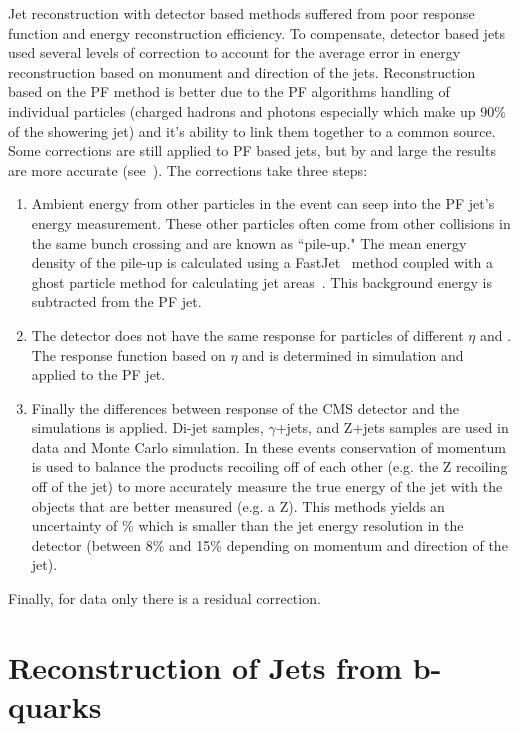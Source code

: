 	Jet reconstruction with detector based methods suffered from poor response function and energy reconstruction efficiency. To compensate, detector based jets used several levels of correction to account for the average error in energy reconstruction based on monument and direction of the jets. Reconstruction based on the PF method is better due to the PF algorithms handling of individual particles (charged hadrons and photons especially which make up 90\% of the showering jet) and it's ability to link them together to a common source. Some corrections are still applied to PF based jets, but by and large the results are more accurate (see~\cite{cmsjetcal}). The corrections take three steps:
	\begin{enumerate}
	\item Ambient energy from other particles in the event can seep into the PF jet's energy measurement. These other particles often come from other collisions in the same bunch crossing and are known as ``pile-up." The mean energy density of the pile-up is calculated using a FastJet~\cite{fastjet} method coupled with a ghost particle method for calculating jet areas~\cite{jetarea}. This background energy is subtracted from the PF jet.
	\item The detector does not have the same response for particles of different $\eta$ and \pt. The response function based on $\eta$ and \pt is determined in simulation and applied to the PF jet.
	\item Finally the differences between response of the CMS detector and the simulations is applied. Di-jet samples, $\gamma$+jets, and Z+jets samples are used in data and Monte Carlo simulation. In these events conservation of momentum is used to balance the products recoiling off of each other (e.g. the Z recoiling off of the jet) to more accurately measure the true energy of the jet with the objects that are better measured (e.g. a Z). This methods yields an uncertainty of \% which is smaller than the jet energy resolution in the detector (between 8\% and 15\% depending on momentum and direction of the jet).
	\end{enumerate}
	
	Finally, for data only there is a residual correction.\\
	
	
	
	
	\section{Reconstruction of Jets from b-quarks}
	\label{sec:csv_reconstruction}
	
